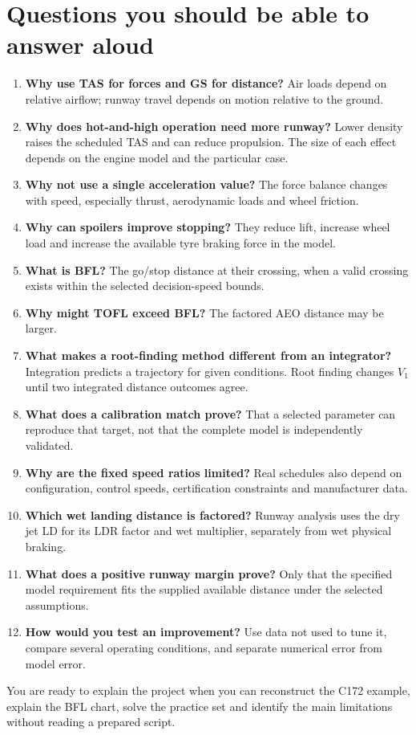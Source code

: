 \documentclass[11pt,letterpaper]{article}
\newcommand{\topic}[1]{\clearpage\section{#1}}
\begin{document}
\topic{Questions you should be able to answer aloud}
\begin{enumerate}
\item \textbf{Why use TAS for forces and GS for distance?} Air loads depend on
relative airflow; runway travel depends on motion relative to the ground.
\item \textbf{Why does hot-and-high operation need more runway?} Lower density
raises the scheduled TAS and can reduce propulsion. The size of each effect depends
on the engine model and the particular case.
\item \textbf{Why not use a single acceleration value?} The force balance changes
with speed, especially thrust, aerodynamic loads and wheel friction.
\item \textbf{Why can spoilers improve stopping?} They reduce lift, increase wheel
load and increase the available tyre braking force in the model.
\item \textbf{What is BFL?} The go/stop distance at their crossing, when a valid
crossing exists within the selected decision-speed bounds.
\item \textbf{Why might TOFL exceed BFL?} The factored AEO distance may be larger.
\item \textbf{What makes a root-finding method different from an integrator?}
Integration predicts a trajectory for given conditions. Root finding changes $V_1$
until two integrated distance outcomes agree.
\item \textbf{What does a calibration match prove?} That a selected parameter can
reproduce that target, not that the complete model is independently validated.
\item \textbf{Why are the fixed speed ratios limited?} Real schedules also depend
on configuration, control speeds, certification constraints and manufacturer data.
\item \textbf{Which wet landing distance is factored?} Runway analysis uses the
dry jet LD for its LDR factor and wet multiplier, separately from wet physical braking.
\item \textbf{What does a positive runway margin prove?} Only that the specified
model requirement fits the supplied available distance under the selected assumptions.
\item \textbf{How would you test an improvement?} Use data not used to tune it,
compare several operating conditions, and separate numerical error from model error.
\end{enumerate}
\begin{keyidea}
You are ready to explain the project when you can reconstruct the C172 example,
explain the BFL chart, solve the practice set and identify the main limitations
without reading a prepared script.
\end{keyidea}
\end{document}
